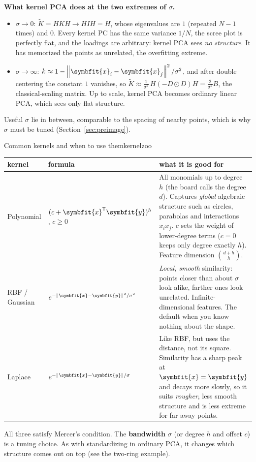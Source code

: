 \documentclass[11pt]{article}
\newcommand{\bm}[1]{\symbfit{#1}}
\newcommand{\vx}{\bm{x}}
\newcommand{\vy}{\bm{y}}
\newcommand{\T}{^{\mathsf T}}
\newcommand{\norm}[1]{\left\lVert #1\right\rVert}
\newcommand{\had}{\odot}
\begin{document}
\begin{careful}
\textbf{What kernel PCA does at the two extremes of $\sigma$.}
\begin{itemize}[nosep]
\item $\sigma\to0$: $\widetilde K=HKH\to HIH=H$, whose eigenvalues are $1$ (repeated $N-1$ times) and $0$. Every kernel PC has the same variance
$1/N$, the scree plot is perfectly flat, and the loadings are arbitrary: kernel PCA sees \emph{no structure}. It has memorized
the points as unrelated, the overfitting extreme.
\item $\sigma\to\infty$: $k\approx1-\norm{\vx_i-\vx_j}^2/\sigma^2$, and after double centering the constant $1$ vanishes, so
$\widetilde K\approx\tfrac1{\sigma^2}\,H(-D\had D)H=\tfrac2{\sigma^2}B$, the classical-scaling matrix. Up to scale, kernel PCA becomes ordinary
linear PCA, which sees only flat structure.
\end{itemize}
Useful $\sigma$ lie in between, comparable to the spacing of nearby points, which is why $\sigma$ must be tuned (Section~\ref{sec:preimage}).
\end{careful}

\begin{example}{Common kernels and when to use them}{kernelzoo}
\renewcommand{\arraystretch}{1.4}
\small
\begin{tabular}{@{}p{2.1cm}p{4.1cm}p{7.6cm}@{}}
\toprule
kernel & formula & what it is good for \\
\midrule
Polynomial & $(c+\vx\T\vy)^h$, $c\ge0$ & All monomials up to degree $h$ (the board calls the degree $d$). Captures \emph{global} algebraic structure such as circles, parabolas and interactions $x_ix_j$. $c$ sets the weight of lower-degree terms ($c=0$ keeps only degree exactly $h$). Feature dimension $\binom{d+h}{h}$. \\
RBF / Gaussian & $e^{-\norm{\vx-\vy}^2/\sigma^2}$ & \emph{Local, smooth} similarity: points closer than about $\sigma$ look alike, farther ones look unrelated. Infinite-dimensional features. The default when you know nothing about the shape. \\
Laplace & $e^{-\norm{\vx-\vy}/\sigma}$ & Like RBF, but uses the distance, not its square. Similarity has a sharp peak at $\vx=\vy$ and decays more slowly, so it suits \emph{rougher}, less smooth structure and is less extreme for far-away points. \\
\bottomrule
\end{tabular}

\smallskip
All three satisfy Mercer's condition. The \textbf{bandwidth} $\sigma$ (or degree $h$ and offset $c$) is a
tuning choice. As with standardizing in ordinary PCA, it changes which structure comes out on top
(see the two-ring example).
\end{example}
\end{document}
